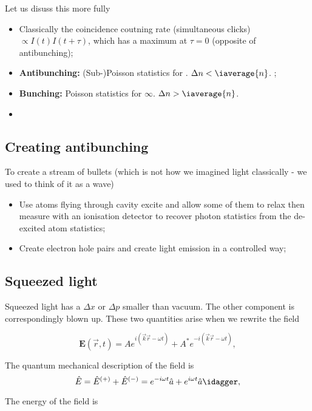 Let us disuss this more fully
\begin{itemize}
\item Classically  the coincidence coutning rate  (simultaneous clicks)
  $ \propto I(t)I(t+\tau)  $, which has a maximum  at $ \tau = 0  $ (opposite of
  antibunching);
\item \textbf{Antibunching:} (Sub-)Poisson  statistics for 
  .  $  \Delta  n <  \iaverage{n}$.  ;
\item  \textbf{Bunching:}  Poisson  statistics  for    \ira
  $ \infty $. $ \Delta n > \iaverage{n} $.
\item
\end{itemize}

 \subsection{Creating antibunching}
 To create  a stream  of bullets  (which is not  how we  imagined light
 classically - we used to think of it as a wave)
 \begin{itemize}
 \item Use  atoms flying through cavity  \ira excite and allow  some of
   them  to relax  \ira then  measure  with an  ionisation detector  to
   recover photon statistics from the de-excited atom statistics;
 \item  Create electron  hole  pairs  and create  light  emission in  a
   controlled way;
 \end{itemize}

 \subsection{Squeezed light}
 Squeezed light has a $ \Delta x $ or $ \Delta p $ smaller than vacuum. The other
 component  is correspondingly  blown up.   These two  quantities arise
 when we rewrite the field

  \begin{equation}
    \mathbf{E}(\vec{r},t) = Ae^{i(\vec{k}\vec{r} - \omega t)} + A^{*}e^{-i(\vec{k}\vec{r} - \omega t)},
  \end{equation}

  The quantum mechanical description of the field is
  \[
    \hat{E} =  \hat{E}^{(+)} + \hat{E}^{(-)} =  e^{-i\omega t}\hat{a} +
    e^{i\omega t}\hat{a}\idagger,
  \]

  \noindent  {} The energy of the field is

